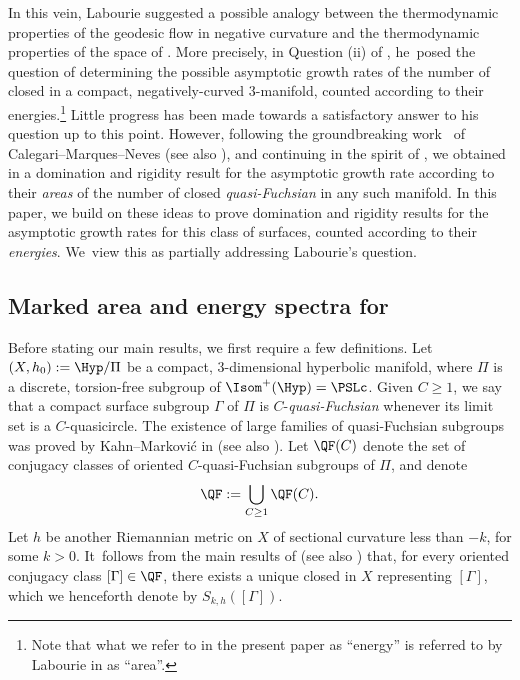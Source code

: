 In this vein, Labourie suggested a possible analogy between the thermodynamic properties of the geodesic flow in negative curvature and the thermodynamic properties of the space of \ksurfaces \cite{LabourieInvent,Labourie_phase_space}. More precisely, in Question (ii) of \cite[\S1.2]{LabourieInvent}, he~posed the question of determining the possible asymptotic growth rates of the number of closed \ksurfaces in a compact, negatively-curved $3$\nobreakdash-manifold, counted according to their energies.\footnote{Note that what we refer to in the present paper as ``energy'' is referred to by Labourie in \cite{LabourieInvent} as ``area''.} Little progress has been made towards a satisfactory answer to his question up to this point. However, following the groundbreaking work~\cite{CMN} of Calegari--Marques--Neves (see also \cite{LabourieBourbaki}), and continuing in the spirit of \cite{BCG}, we obtained in \cite{ALS} a domination and rigidity result for the asymptotic growth rate according to their \emph{areas} of the number of closed \emph{quasi-Fuchsian} \ksurfaces in any such manifold. In this paper, we build on these ideas to prove domination and rigidity results for the asymptotic growth rates for this class of surfaces, counted according to their \textit{energies}. We~view this as partially addressing Labourie's question.

\subsection{Marked area and energy spectra for \ksurfaces}

Before stating our main results, we first require a few definitions. Let $(X,h_0):=\Hyp/\Pi$ be a compact, $3$\nobreakdash-dimensional hyperbolic manifold, where $\Pi$ is a discrete, torsion-free subgroup of $\Isom^+(\Hyp)=\PSLc$. Given $C\geq 1$, we say that a compact surface subgroup $\Gamma$ of $\Pi$ is $C$-\emph{quasi-Fuchsian} whenever its limit set is a $C$-quasicircle. The existence of large families of quasi-Fuchsian subgroups was proved by Kahn--Markovi\'c in \cite{KM1,KM2} (see also \cite{HamenstadtKM,Kahn_Labourie_Mozes}). Let $\QF(C)$ denote the set of conjugacy classes of oriented $C$-quasi-Fuchsian subgroups of $\Pi$, and denote
\begin{equation*}
\QF:=\bigcup_{C\geq 1}\QF(C).
\end{equation*}
Let $h$ be another Riemannian metric on $X$ of sectional curvature less than $-k$, for some $k>0$. It~follows from the main results of \cite{LabourieInvent} (see also \cite{Smith_asymp}) that, for every oriented conjugacy class $[\Gamma]\in\QF$, there exists a unique closed \ksurface in $X$ representing $[\Gamma]$, which we henceforth denote by $S_{k,h}([\Gamma])$.

